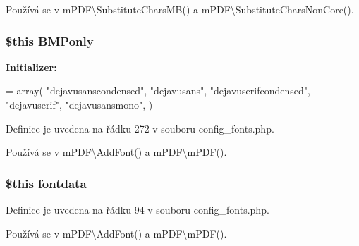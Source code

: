 Používá se v m\-P\-D\-F\textbackslash{}\-Substitute\-Chars\-M\-B() a m\-P\-D\-F\textbackslash{}\-Substitute\-Chars\-Non\-Core().

\hypertarget{config__fonts_8php_a4cae730e8755c0dac19a7b97d9cdff30}{
\subsubsection[{B\-M\-Ponly}]{\setlength{\rightskip}{0pt plus 5cm}\$this B\-M\-Ponly}}\label{config__fonts_8php_a4cae730e8755c0dac19a7b97d9cdff30}
{\bfseries Initializer\-:}
\begin{DoxyCode}
= array(
    \textcolor{stringliteral}{"dejavusanscondensed"},
    \textcolor{stringliteral}{"dejavusans"},
    \textcolor{stringliteral}{"dejavuserifcondensed"},
    \textcolor{stringliteral}{"dejavuserif"},
    \textcolor{stringliteral}{"dejavusansmono"},
    )
\end{DoxyCode}


Definice je uvedena na řádku 272 v souboru config\-\_\-fonts.\-php.



Používá se v m\-P\-D\-F\textbackslash{}\-Add\-Font() a m\-P\-D\-F\textbackslash{}m\-P\-D\-F().

\hypertarget{config__fonts_8php_a75d3623c25db4c42e42da8e5e1361292}{
\subsubsection[{fontdata}]{\setlength{\rightskip}{0pt plus 5cm}\$this fontdata}}\label{config__fonts_8php_a75d3623c25db4c42e42da8e5e1361292}


Definice je uvedena na řádku 94 v souboru config\-\_\-fonts.\-php.



Používá se v m\-P\-D\-F\textbackslash{}\-Add\-Font() a m\-P\-D\-F\textbackslash{}m\-P\-D\-F().

